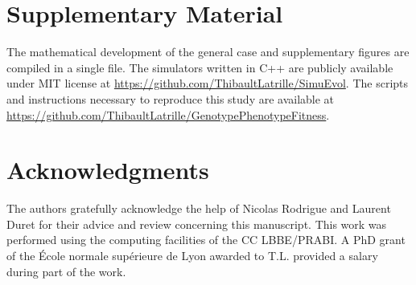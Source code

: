 \documentclass[a4paper]{MBE}
\begin{document}
\maketitle




\section{Supplementary Material}
The mathematical development of the general case and supplementary figures are compiled in a single file.
The simulators written in C++ are publicly available under MIT license at \url{https://github.com/ThibaultLatrille/SimuEvol}.
The scripts and instructions necessary to reproduce this study are available at \url{https://github.com/ThibaultLatrille/GenotypePhenotypeFitness}.

\section{Acknowledgments}

The authors gratefully acknowledge the help of Nicolas Rodrigue and Laurent Duret for their advice and review concerning this manuscript.
This work was performed using the computing facilities of the CC LBBE/PRABI.
A PhD grant of the École normale supérieure de Lyon awarded to T.L. provided a salary during part of the work.


\end{document}
